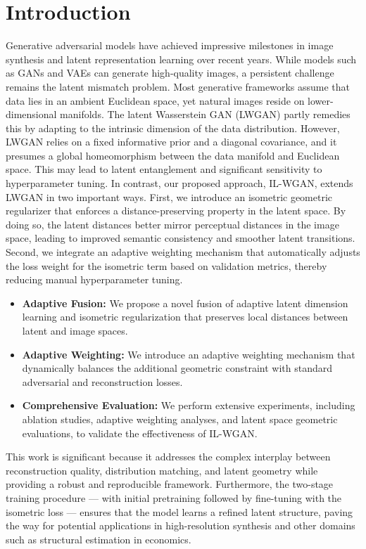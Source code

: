 \documentclass{article} %
\begin{document}
\section{Introduction}
\label{sec:intro}
Generative adversarial models have achieved impressive milestones in image synthesis and latent representation learning over recent years. While models such as GANs and VAEs can generate high-quality images, a persistent challenge remains the latent mismatch problem. Most generative frameworks assume that data lies in an ambient Euclidean space, yet natural images reside on lower-dimensional manifolds. The latent Wasserstein GAN (LWGAN) partly remedies this by adapting to the intrinsic dimension of the data distribution. However, LWGAN relies on a fixed informative prior and a diagonal covariance, and it presumes a global homeomorphism between the data manifold and Euclidean space. This may lead to latent entanglement and significant sensitivity to hyperparameter tuning. In contrast, our proposed approach, IL-WGAN, extends LWGAN in two important ways. First, we introduce an isometric geometric regularizer that enforces a distance-preserving property in the latent space. By doing so, the latent distances better mirror perceptual distances in the image space, leading to improved semantic consistency and smoother latent transitions. Second, we integrate an adaptive weighting mechanism that automatically adjusts the loss weight for the isometric term based on validation metrics, thereby reducing manual hyperparameter tuning.

\begin{itemize}
  \item \textbf{Adaptive Fusion:} We propose a novel fusion of adaptive latent dimension learning and isometric regularization that preserves local distances between latent and image spaces.
  \item \textbf{Adaptive Weighting:} We introduce an adaptive weighting mechanism that dynamically balances the additional geometric constraint with standard adversarial and reconstruction losses.
  \item \textbf{Comprehensive Evaluation:} We perform extensive experiments, including ablation studies, adaptive weighting analyses, and latent space geometric evaluations, to validate the effectiveness of IL-WGAN.
\end{itemize}

This work is significant because it addresses the complex interplay between reconstruction quality, distribution matching, and latent geometry while providing a robust and reproducible framework. Furthermore, the two-stage training procedure --- with initial pretraining followed by fine-tuning with the isometric loss --- ensures that the model learns a refined latent structure, paving the way for potential applications in high-resolution synthesis and other domains such as structural estimation in economics.
\end{document}
